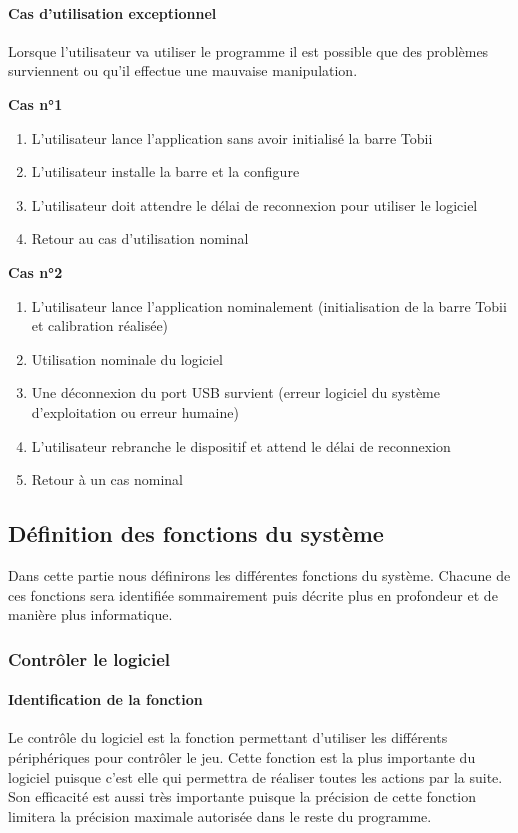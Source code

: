 \documentclass{polytech/polytech}
\begin{document}
\paragraph{Cas d'utilisation exceptionnel}
Lorsque l'utilisateur va utiliser le programme il est possible que des problèmes surviennent ou qu'il effectue une mauvaise manipulation.

\textbf{Cas n°1}
\begin{enumerate}
\item L'utilisateur lance l'application sans avoir initialisé la barre Tobii
\item L'utilisateur installe la barre et la configure
\item L'utilisateur doit attendre le délai de reconnexion pour utiliser le logiciel
\item Retour au cas d'utilisation nominal
\end{enumerate}

\textbf{Cas n°2}
\begin{enumerate}
\item L'utilisateur lance l'application nominalement (initialisation de la barre Tobii et calibration réalisée)
\item Utilisation nominale du logiciel
\item Une déconnexion du port USB survient (erreur logiciel du système d'exploitation ou erreur humaine)
\item L'utilisateur rebranche le dispositif et attend le délai de reconnexion
\item Retour à un cas nominal
\end{enumerate}



\subsection{Définition des fonctions du système}
Dans cette partie nous définirons les différentes fonctions du système. Chacune de ces fonctions sera identifiée sommairement puis décrite plus en profondeur et de manière plus informatique.
\subsubsection{Contrôler le logiciel}
\paragraph{Identification de la fonction}
Le contrôle du logiciel est la fonction permettant d'utiliser les différents périphériques pour contrôler le jeu. Cette fonction est la plus importante du logiciel puisque c'est elle qui permettra de réaliser toutes les actions par la suite. Son efficacité est aussi très importante puisque la précision de cette fonction limitera la précision maximale autorisée dans le reste du programme.
\end{document}
